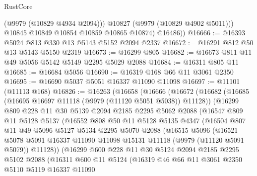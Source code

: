 \begin{lexlean}{RustCore}
\begin{coremodule}
              (@9979 (@10829 @4934 @2094)))
            @10827
            (@9979 (@10829 @4902 @5011)))
          @10845
          @10849
          @10854
          @10859
          @10865
          @10874)
        @16486))
@16666 := @16393 @5024 @813 @330 @13 @5143 @5152 @2094 @2337
@16672 := @16291 @812 @50 @13 @5143 @5150 @2319
@16673 := @16299 @805
@16682 := @16673 @811 @11 @49 @5056 @5142 @5149 @2295 @5029 @2088
@16684 := @16311 @805 @11
@16685 := @16684 @5056
@16690 := @16319 @168 @66 @11 @3061 @2350
@16695 := @16690 @5037 @5051 @16337 @11090 @11098
@16697 := @11101 (@11113 @168)
@16826 := @16263
    (@16658
      (@16666
        (@16672
          (@16682
            (@16685 (@16695 @16697 @11118 (@9979 (@11120 @5051 @5038)) @11128))
            (@16299
              @809
              @228
              @11
              @30
              @5139
              @2094
              @2185
              @2295
              @5062
              @2088
              (@16547
                @809
                @11
                @5128
                @5137
                (@16552
                  @808
                  @50
                  @11
                  @5128
                  @5135
                  @4347
                  (@16504
                    @807
                    @11
                    @49
                    @5096
                    @5127
                    @5134
                    @2295
                    @5070
                    @2088
                    (@16515
                      @5096
                      (@16521
                        @5078
                        @5091
                        @16337
                        @11090
                        @11098
                        @15131
                        @11118
                        (@9979 (@11120 @5091 @5079))
                        @11128))
                    (@16299
                      @600
                      @228
                      @11
                      @30
                      @5124
                      @2094
                      @2185
                      @2295
                      @5102
                      @2088
                      (@16311
                        @600
                        @11
                        @5124
                        (@16319
                          @46
                          @66
                          @11
                          @3061
                          @2350
                          @5110
                          @5119
                          @16337
                          @11090

\end{coremodule}
\end{lexlean}
